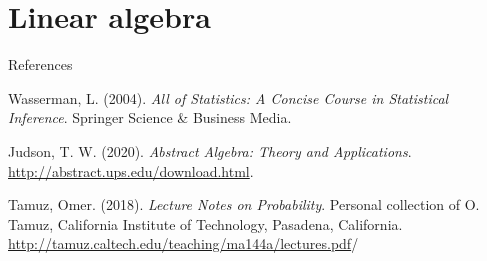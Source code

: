 \documentclass{beamer}
\begin{document}
\section{Linear algebra}

\begin{frame}{References}
    \begin{thebibliography}{99}
        Wasserman, L. (2004). \textit{All of Statistics: A Concise Course in
        Statistical Inference}. Springer Science \& Business Media.

        Judson, T. W. (2020). \textit{Abstract Algebra: Theory and
        Applications}. \url{http://abstract.ups.edu/download.html}.

        Tamuz, Omer. (2018). \textit{Lecture Notes on Probability}. Personal
        collection of O. Tamuz, California Institute of Technology, Pasadena,
        California.
        \url{http://tamuz.caltech.edu/teaching/ma144a/lectures.pdf}/        
    \end{thebibliography}
\end{frame}
\end{document}
